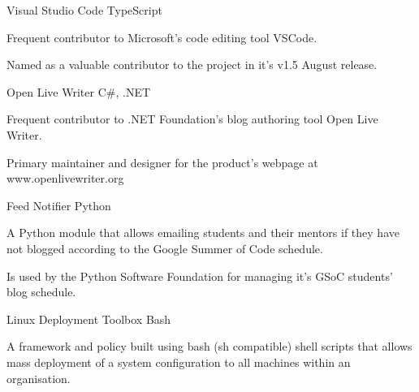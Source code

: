 
\begin{projentries}

  \projentry%
    {Visual Studio Code} %
    {TypeScript} %
    {} %
    {%
      \begin{projitems} %
        \item{Frequent contributor to Microsoft's code editing tool VSCode.}
        \item{Named as a valuable contributor to the project in it's v1.5 August release.}
      \end{projitems}
    }

  \projentry%
    {Open Live Writer} %
    {C\#, .NET} %
    {} %
    {%
      \begin{projitems} %
        \item{Frequent contributor to .NET Foundation’s blog authoring tool Open Live Writer.}
        \item{Primary maintainer and designer for the product's webpage at www.openlivewriter.org}
      \end{projitems}
    }

  \projentry%
    {Feed Notifier} %
    {Python} %
    {} %
    {%
      \begin{projitems} %
        \item{A Python module that allows emailing students and their mentors if they have not blogged according to the Google Summer of Code schedule.}
        \item{Is used by the Python Software Foundation for managing it's GSoC students' blog schedule.}
      \end{projitems}
    }

  \projentry%
    {Linux Deployment Toolbox} %
    {Bash} %
    {} %
    {%
      \begin{projitems} %
        \item{A framework and policy built using bash (sh compatible) shell scripts that allows mass deployment of a system configuration to all machines within an organisation.}
      \end{projitems}
    }


\end{projentries}
